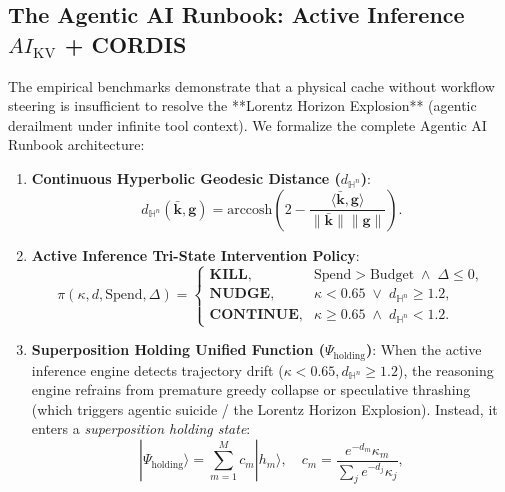 \subsection{The Agentic AI Runbook: Active Inference $AI_{\text{KV}}$ + CORDIS}
\label{sec:runbook}

The empirical benchmarks demonstrate that a physical cache without workflow steering is insufficient to resolve the **Lorentz Horizon Explosion** (agentic derailment under infinite tool context). We formalize the complete Agentic AI Runbook architecture:
\begin{enumerate}
    \item \textbf{Continuous Hyperbolic Geodesic Distance ($d_{\mathbb{H}^n}$)}:
    \begin{equation}
        d_{\mathbb{H}^n}(\bar{\mathbf{k}}, \mathbf{g}) = \text{arccosh}\left(2 - \frac{\langle \bar{\mathbf{k}}, \mathbf{g} \rangle}{\|\bar{\mathbf{k}}\| \|\mathbf{g}\|}\right).
    \end{equation}
    \item \textbf{Active Inference Tri-State Intervention Policy}:
    \begin{equation}
        \pi(\kappa, d, \text{Spend}, \Delta) =
        \begin{cases}
            \textbf{KILL}, & \text{Spend} > \text{Budget} \;\land\; \Delta \le 0, \\
            \textbf{NUDGE}, & \kappa < 0.65 \;\lor\; d_{\mathbb{H}^n} \ge 1.2, \\
            \textbf{CONTINUE}, & \kappa \ge 0.65 \;\land\; d_{\mathbb{H}^n} < 1.2.
        \end{cases}
    \end{equation}
    \item \textbf{Superposition Holding Unified Function ($\Psi_{\text{holding}}$)}:
    When the active inference engine detects trajectory drift ($\kappa < 0.65, d_{\mathbb{H}^n} \ge 1.2$), the reasoning engine refrains from premature greedy collapse or speculative thrashing (which triggers agentic suicide / the Lorentz Horizon Explosion). Instead, it enters a \textit{superposition holding state}:
    \begin{equation}
        |\Psi_{\text{holding}}\rangle = \sum_{m=1}^M c_m |h_m\rangle, \quad c_m = \frac{e^{-d_m} \kappa_m}{\sum_j e^{-d_j} \kappa_j},
    \end{equation}

\end{enumerate}
